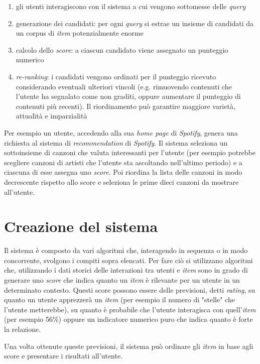 \begin{enumerate}
    \item gli utenti interagiscono con il sistema a cui vengono sottomesse delle \textit{query}
    \item generazione dei candidati: per ogni \textit{query} si estrae un insieme di candidati da un corpus di \textit{item} potenzialmente enorme
    \item calcolo dello \textit{score}: a ciascun candidato viene assegnato un punteggio numerico
    \item \textit{re-ranking}: i candidati vengono ordinati per il punteggio ricevuto considerando eventuali ulteriori vincoli (e.g. rimuovendo contenuti che l'utente ha segnalato come non graditi, oppure aumentare il punteggio di contenuti più recenti). Il riordinamento può garantire maggiore varietà, attualità e imparzialità
\end{enumerate}

Per esempio un utente, accedendo alla sua \textit{home page} di \textit{Spotify}, genera una richiesta al sistema di \textit{recommendation} di \textit{Spotify}. Il sistema seleziona un sottoinsieme di canzoni che valuta interessanti per l'utente (per esempio potrebbe scegliere canzoni di artisti che l'utente sta ascoltando nell'ultimo periodo) e a ciascuna di esse assegna uno \textit{score}. Poi riordina la lista delle canzoni in modo decrescente rispetto allo score e seleziona le prime dieci canzoni da mostrare all'utente.

\section{Creazione del sistema}

Il sistema è composto da vari algoritmi che, interagendo in sequenza o in modo concorrente, svolgono i compiti sopra elencati. Per fare ciò si utilizzano algoritmi che, utilizzando i dati storici delle interazioni tra utenti e \textit{item} sono in grado di generare uno \textit{score} che indica quanto un \textit{item} è rilevante per un utente in un determinato contesto. Questi score possono essere delle previsioni, detti \textit{rating}, su quanto un utente apprezzerà un \textit{item} (per esempio il numero di "stelle" che l'utente metterebbe), su quanto è probabile che l'utente interagisca con quell'\textit{item} (per esempio 56\%) oppure un indicatore numerico puro che indica quanto è forte la relazione.

Una volta ottenute queste previsioni, il sistema può ordinare gli \textit{item} in base agli score e presentare i risultati all'utente.

